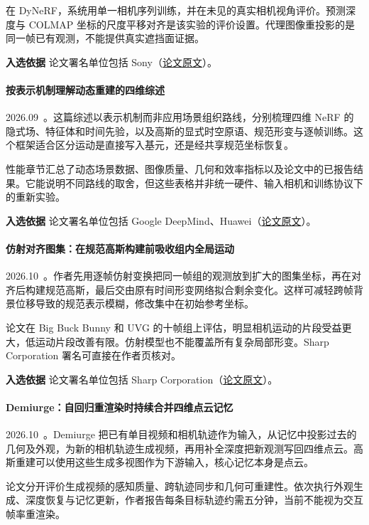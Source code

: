 在 DyNeRF，系统用单一相机序列训练，并在未见的真实相机视角评价。预测深度与 COLMAP 坐标的尺度平移对齐是该实验的评价设置。代理图像重投影的是同一帧已有观测，不能提供真实遮挡面证据。

\textbf{入选依据} 论文署名单位包括 Sony（\href{https://arxiv.org/abs/2609.32711}{论文原文}）。

\paragraph{按表示机制理解动态重建的四维综述}
2026.09~\cite{2609_39960}。这篇综述以表示机制而非应用场景组织路线，分别梳理四维 NeRF 的隐式场、特征体和时间先验，以及高斯的显式时空原语、规范形变与逐帧训练。这个框架适合区分运动是直接写入基元，还是经共享规范坐标恢复。

性能章节汇总了动态场景数据、图像质量、几何和效率指标以及论文中的已报告结果。它能说明不同路线的取舍，但这些表格并非统一硬件、输入相机和训练协议下的重新实验。

\textbf{入选依据} 论文署名单位包括 Google DeepMind、Huawei（\href{https://arxiv.org/abs/2609.39960}{论文原文}）。

\paragraph{仿射对齐图集：在规范高斯构建前吸收组内全局运动}
2026.10~\cite{2610_01114}。作者先用逐帧仿射变换把同一帧组的观测放到扩大的图集坐标，再在对齐后构建规范高斯，最后交由原有时间形变网络拟合剩余变化。这样可减轻跨帧背景位移导致的规范表示模糊，修改集中在初始参考坐标。

论文在 Big Buck Bunny 和 UVG 的十帧组上评估，明显相机运动的片段受益更大，低运动片段改善有限。仿射模型也不能覆盖所有复杂局部形变。Sharp Corporation 署名可直接在作者页核对。

\textbf{入选依据} 论文署名单位包括 Sharp Corporation（\href{https://arxiv.org/html/2610.01114v1}{论文原文}）。

\paragraph{Demiurge：自回归重渲染时持续合并四维点云记忆}
2026.10~\cite{2610_14685}。Demiurge 把已有单目视频和相机轨迹作为输入，从记忆中投影过去的几何及外观，为新的相机轨迹生成视频，再用补全深度把新观测写回四维点云。高斯重建可以使用这些生成多视图作为下游输入，核心记忆本身是点云。

论文分开评价生成视频的感知质量、跨轨迹同步和几何可重建性。依次执行外观生成、深度恢复与记忆更新，作者报告每条目标轨迹约需五分钟，当前不能视为交互帧率重渲染。

